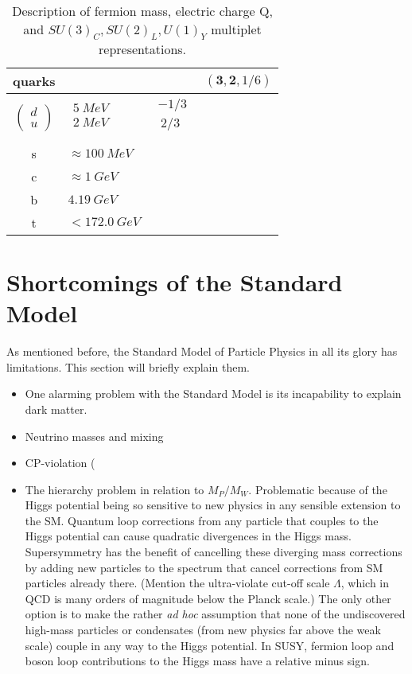 \begin{table}[!htb]
\begin{tabular}{|cllc|}
\hline
\textbf{quarks}&&&$(\mathbf{3}, \mathbf{2}, 1/6)$\\
\hline 
$\begin{pmatrix} d\\ u \end{pmatrix}$
 &$\begin{matrix} 5~MeV\\  2~MeV \\ \end{matrix}$
  &$\begin{matrix} -1/3\\  ~2/3 \\ \end{matrix}$&\\  
\hline
s & $\approx 100~MeV$ &&  \\  
c & $\approx 1~GeV$ && \\ 
\hline
b & $4.19~GeV$ &&  \\  
t & $<172.0~GeV$ &&\\ 
\hline

\hline
\end{tabular}
\caption{Description of fermion mass, electric charge Q, and $SU(3)_{C}, SU(2)_{L}, U(1)_{Y}$ multiplet representations. }
\label{tab:fermion}
\end{table}  
\FloatBarrier

\section{Shortcomings of the Standard Model}
\label{sec:fail}
As mentioned before, the Standard Model of Particle Physics in all its glory has limitations. This section will briefly explain them.

\begin{itemize}
\item One alarming problem with the Standard Model is its incapability to explain dark matter.
\item Neutrino masses and mixing
\item CP-violation (\cite{Sakharov:1967dj}
\item The hierarchy problem in relation to $M_P/M_W$.  Problematic because of the Higgs potential being so sensitive to new physics in any sensible extension to the SM.  Quantum loop corrections from any particle that couples to the Higgs potential can cause quadratic divergences in the Higgs mass.  Supersymmetry has the benefit of cancelling these diverging mass corrections by adding new particles to the spectrum that cancel corrections from SM particles already there.  (Mention the ultra-violate cut-off scale $\Lambda$, which in QCD is many orders of magnitude below the Planck scale.)  The only other option is to make the rather \textit{ad hoc} assumption that none of the undiscovered high-mass particles or condensates (from new physics far above the weak scale) couple in any way to the Higgs potential.  In SUSY, fermion loop and boson loop contributions to the Higgs mass have a relative minus sign.
\end{itemize}


